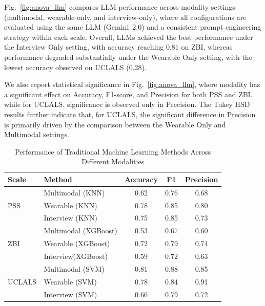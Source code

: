 \documentclass[letterpaper, 10 pt, conference]{ieeeconf}  %
\begin{document}
Fig.~\ref{fig:anova_llm} compares LLM performance across modality settings (multimodal, wearable-only, and interview-only), where all configurations are evaluated using the same LLM (Gemini~2.0) and a consistent prompt engineering strategy within each scale. Overall, LLMs achieved the best performance under the Interview Only setting, with accuracy reaching 0.81 on ZBI, whereas performance degraded substantially under the Wearable Only setting, with the lowest accuracy observed on UCLALS (0.28).

We also report statistical significance in Fig.~\ref{fig:anova_llm}, where modality has a significant effect on Accuracy, F1-score, and Precision for both PSS and ZBI. while for UCLALS, significance is observed only in Precision. The Tukey HSD results further indicate that, for UCLALS, the significant difference in Precision is primarily driven by the comparison between the Wearable Only and Multimodal settings. 

\begin{table}
\caption{Performance of Traditional Machine Learning Methods Across Different Modalities}
\label{tab:ml_results}
\centering
\begin{threeparttable}
\begin{tabular}{llccc}
\hline
\textbf{Scale} & \textbf{Method} & \textbf{Accuracy} & \textbf{F1} & \textbf{Precision} \\
\hline

\multirow{3}{*}{PSS}
& Multimodal (KNN) & 0.62 & 0.76 & 0.68 \\
& Wearable (KNN) & 0.78 & 0.85 & 0.80 \\
& Interview (KNN) & 0.75 & 0.85 & 0.73 \\
\hline

\multirow{3}{*}{ZBI}
& Multimodal (XGBoost) & 0.53 & 0.67 & 0.60 \\
& Wearable (XGBoost) & 0.72 & 0.79 & 0.74 \\
& Interview(XGBoost) & 0.59 & 0.72 & 0.63 \\
\hline

\multirow{3}{*}{UCLALS}
& Multimodal (SVM) & 0.81 & 0.88 & 0.85 \\
& Wearable (SVM) & 0.78 & 0.84 & 0.91 \\
& Interview (SVM) & 0.66 & 0.79 & 0.72 \\
\hline

\end{tabular}
\end{threeparttable}
\end{table}
\end{document}
